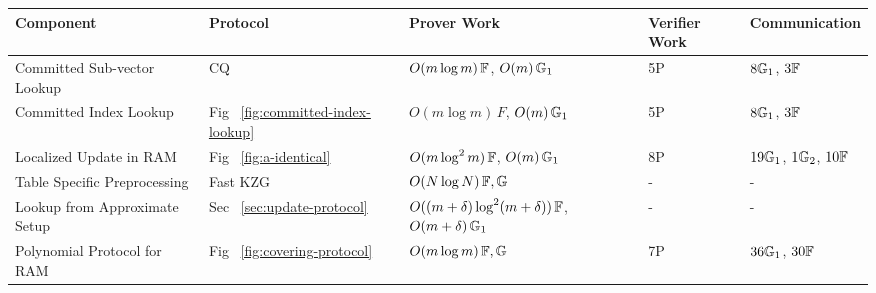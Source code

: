 \begin{table}[bt]
    \begin{tabular}{l|l|l|l|l}
        \hline
        {\bf Component  }                                                                                      & {\bf Protocol} & {\bf Prover Work}      & {\bf Verifier Work} & {\bf Communication}   \\ \hline
        Committed Sub-vector Lookup                                                                     & CQ ~\cite{EPRINT:EagFioGab22}      & $O(m \log m)\,\mathbb{F}$, $O(m)\,\mathbb{G}_1$      & 5P            & $8\mathbb{G}_1$, $3\mathbb{F}$         \\ \hline
        Committed Index Lookup                                                                          & Fig ~\ref{fig:committed-index-lookup}    & $O(m \log m)\,F$, $O(m)\,\mathbb{G}_1$      & 5P            & $8\mathbb{G}_1$, $3\mathbb{F}$         \\ \hline
        Localized Update in RAM                                                                                & Fig ~\ref{fig:a-identical}   & $O(m \log^2 m)\, \mathbb{F}$, $O(m)\,\mathbb{G}_1$      & 8P            & $19\mathbb{G}_1$, $1\mathbb{G}_2$, $10\mathbb{F}$ \\ \hline
        Table Specific Preprocessing                                                                    & Fast KZG ~\cite{EPRINT:FeiKho23}      & $O(N \log N)\,\mathbb{F},\mathbb{G}$      & -             & -               \\ \hline
        Lookup from Approximate Setup                                                                   & Sec ~\ref{sec:update-protocol}    & $O((m+\delta)\log^2(m+\delta))\,\mathbb{F}$, $O(m+\delta)\,\mathbb{G}_1$ & -             & -               \\ \hline
        Polynomial Protocol for RAM                                                                     & Fig ~\ref{fig:covering-protocol}   & $O(m \log m)\, \mathbb{F},\mathbb{G}$      & 7P            & $36\mathbb{G}_1$, $30\mathbb{F}$       \\ \hline

\end{tabular}
\end{table}

